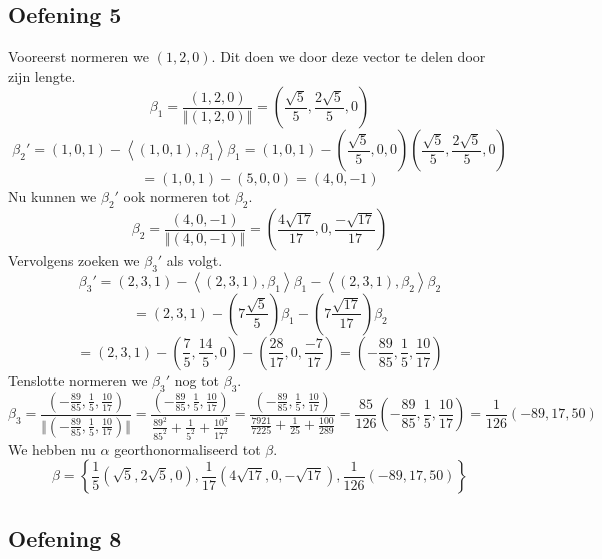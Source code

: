 \documentclass[lineaire_algebra_oplossingen.tex]{subfiles}
\begin{document}
\subsection{Oefening 5}
Vooreerst normeren we $(1,2,0)$. Dit doen we door deze vector te delen door zijn lengte.
\[
\beta_1 = \frac{(1,2,0)}{\Vert(1,2,0)\Vert}
= \left(\frac{\sqrt{5}}{5},\frac{2\sqrt{5}}{5},0\right)
\]
\[
\beta_2' = (1,0,1) - \left\langle (1,0,1),\beta_1 \right\rangle \beta_1
= (1,0,1) - \left(\frac{\sqrt{5}}{5},0,0\right)\left(\frac{\sqrt{5}}{5},\frac{2\sqrt{5}}{5},0\right)
\]
\[
=(1,0,1) - (5,0,0) = (4,0,-1)
\]
Nu kunnen we $\beta_2'$ ook normeren tot $\beta_2$.
\[
\beta_2 = \frac{(4,0,-1)}{\Vert (4,0,-1)\Vert}
= \left( \frac{4\sqrt{17}}{17},0,\frac{-\sqrt{17}}{17} \right)
\]
Vervolgens zoeken we $\beta_3'$ als volgt.
\[
\beta_3'
= (2,3,1)
- \left\langle (2,3,1),\beta_1\right\rangle\beta_1
- \left\langle (2,3,1),\beta_2\right\rangle\beta_2
\]
\[
= (2,3,1)
- \left(7\frac{\sqrt{5}}{5}\right)  \beta_1
- \left(7\frac{\sqrt{17}}{17} \right)  \beta_2
\]
\[
=(2,3,1)
- \left(\frac{7}{5},\frac{14}{5},0\right)
- \left( \frac{28}{17},0,\frac{-7}{17} \right)
= 
\left(-\frac{89}{85},\frac{1}{5},\frac{10}{17}\right)
\]
Tenslotte normeren we $\beta_3'$ nog tot $\beta_3$.
\[
\beta_3 = 
\frac{\left(-\frac{89}{85},\frac{1}{5},\frac{10}{17}\right)}
{\Vert\left(-\frac{89}{85},\frac{1}{5},\frac{10}{17}\right)\Vert}
= 
\frac{\left(-\frac{89}{85},\frac{1}{5},\frac{10}{17}\right)}
{\frac{89^2}{85^2}+\frac{1}{5^2}+\frac{10^2}{17^2}}
=
\frac{\left(-\frac{89}{85},\frac{1}{5},\frac{10}{17}\right)}
{\frac{7921}{7225}+\frac{1}{25}+\frac{100}{289}}
=
\frac{85}{126}
\left(-\frac{89}{85},\frac{1}{5},\frac{10}{17}\right)
=
\frac{1}{126}
\left(-89,17,50\right)
\]
We hebben nu $\alpha$ georthonormaliseerd tot $\beta$.
\[
\beta
=
\left\{
\frac{1}{5}
\left(\sqrt{5},2\sqrt{5},0\right)
,
\frac{1}{17}
\left( 4\sqrt{17},0,-\sqrt{17} \right)
,
\frac{1}{126}
\left(-89,17,50\right)
\right\}
\]


\subsection{Oefening 8}
\end{document}
